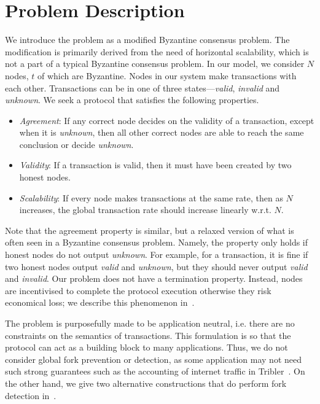\section{Problem Description}
\label{sec:description}
We introduce the problem as a modified Byzantine consensus problem.
The modification is primarily derived from the need of horizontal scalability,
which is not a part of a typical Byzantine consensus problem.
In our model, we consider $N$ nodes, $t$ of which are Byzantine.
Nodes in our system make transactions with each other.
Transactions can be in one of three states---\emph{valid}, \emph{invalid} and \emph{unknown}.
We seek a protocol that satisfies the following properties.
\begin{itemize}
    \item \emph{Agreement}:
        If any correct node decides on the validity of a transaction, except when it is \emph{unknown},
        then all other correct nodes are able to reach the same conclusion or decide \emph{unknown}.
    \item \emph{Validity}:
        If a transaction is valid, then it must have been created by two honest nodes.
    \item \emph{Scalability}:
        If every node makes transactions at the same rate,
        then as $N$ increases,
        the global transaction rate should increase linearly w.r.t. $N$.
\end{itemize}

Note that the agreement property is similar, but a relaxed version of what is often seen in a Byzantine consensus problem.
Namely, the property only holds if honest nodes do not output \emph{unknown}.
For example, for a transaction, it is fine if two honest nodes output \emph{valid} and \emph{unknown}, but they should never output \emph{valid} and \emph{invalid}.
Our problem does not have a termination property.
Instead, nodes are incentivised to complete the protocol execution otherwise they risk economical loss;
we describe this phenomenon in~.

The problem is purposefully made to be application neutral,
i.e. there are no constraints on the semantics of transactions.
This formulation is so that the protocol can act as a building block to many applications.
Thus, we do not consider global fork prevention or detection,
as some application may not need such strong guarantees such as the accounting of internet traffic in Tribler~\cite{pimotte, pouwelse2008tribler}.
On the other hand, we give two alternative constructions that do perform fork detection in~.

